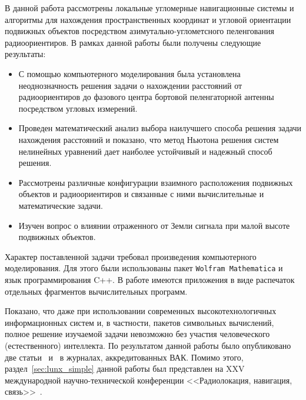 \documentclass[../main.tex]{subfiles}
\begin{document}
В данной работа рассмотрены локальные угломерные навигационные системы и алгоритмы для нахождения пространственных координат и угловой ориентации подвижных объектов посредством азимутально-углометсного пеленгования радиоориентиров. В рамках данной работы были получены следующие результаты:
\begin{itemize}
    \item С помощью компьютерного моделирования была установлена неоднозначность решения задачи о нахождении расстояний от радиоориентиров до фазового центра бортовой пеленгаторной антенны посредством угловых измерений.
    \item Проведен математический анализ выбора наилучшего способа решения задачи нахождения расстояний и показано, что метод Ньютона решения систем нелинейных уравнений дает наиболее устойчивый и надежный способ решения.
    \item Рассмотрены различные конфигурации взаимного расположения подвижных объектов и радиоориентиров и связанные с ними вычислительные и математические задачи.
    \item Изучен вопрос о влиянии отраженного от Земли сигнала при малой высоте подвижных объектов.
\end{itemize}

Характер поставленной задачи требовал произведения компьютерного моделирования. Для этого были использованы пакет \texttt{Wolfram Mathematica} и язык программирования C++. В работе имеются приложения в виде распечаток отдельных фрагментов вычислительных программ.

Показано, что даже при использовании современных высокотехнологичных информационных систем и, в частности, пакетов символьных вычислений, полное решение изучаемой задачи невозможно без участия человеческого (естественного) интеллекта. По результатом данной работы было опубликовано две статьи~\cite{WMM:2018} и~\cite{WMMU:2019:IIS} в журналах, аккредитованных ВАК. Помимо этого, раздел~\ref{sec:lunx_simple} данной работы был представлен на XXV международной научно-технической конференции  <<Радиолокация, навигация, связь>>~\cite{WMMU:2019:RLNC}.
\end{document}
